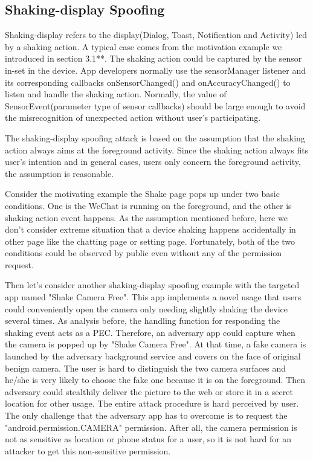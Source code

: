 \documentclass{sig-alternate-05-2015}
\begin{document}
\subsection{Shaking-display Spoofing}
Shaking-display refers to the display(Dialog, Toast, Notification and Activity) led by a shaking action. A typical case comes from the motivation example we introduced in section 3.1**. The shaking action could be captured by the sensor in-set in the device. App developers normally use the sensorManager listener and its corresponding callbacks onSensorChanged() and onAccuracyChanged() to listen and handle the shaking action. Normally, the value of SensorEvent(parameter type of sensor callbacks) should be large enough to avoid the misrecognition of unexpected action without user's participating.

The shaking-display spoofing attack is based on the assumption that the shaking action always aims at the foreground activity. Since the shaking action always fits user's intention and in general cases, users only concern the foreground activity, the assumption is reasonable.

Consider the motivating example the Shake page pops up under two basic conditions. One is the WeChat is running on the foreground, and the other is shaking action event happens. As the assumption mentioned before, here we don't consider extreme situation that a device shaking happens accidentally in other page like the chatting page or setting page. Fortunately, both of the two conditions could be observed by public even without any of the permission request. 

Then let's consider another shaking-display spoofing example with the targeted app named "Shake Camera Free". This app implements a novel usage that users could conveniently open the camera only needing slightly shaking the device several times. As analysis before, the handling function for responding the shaking event acts as a PEC. Therefore, an adversary app could capture when the camera is popped up by "Shake Camera Free". At that time, a fake camera is launched by the adversary background service and covers on the face of original benign camera. The user is hard to distinguish the two camera surfaces and he/she is very likely to choose the fake one because it is on the foreground. Then adversary could stealthily deliver the picture to the web or store it in a secret location for other usage. The entire attack procedure is hard perceived by user. The only challenge that the adversary app has to overcome is to request the  "android.permission.CAMERA" permission. After all, the camera permission is not as sensitive as location or phone status for a user, so it is not hard for an attacker to get this non-sensitive permission.
\end{document}
